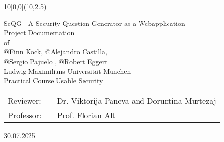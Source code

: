 \documentclass{thesisclass}
\makeatletter
\newcommand{\type}{Project Documentation}
\newcommand{\group}{\href{https://github.com/finnkock}{@Finn Kock}, \href{https://github.com/alecasbar}{@Alejandro Castilla}, \\
					\href{https://github.com/sergioPajuelo}{@Sergio Pajuelo} , \href{https://github.com/RobertEggert}{@Robert Eggert}}
\newcommand{\mytitle}{SeQG - A Security Question Generator as a Webapplication}
\newcommand{\course}{Practical Course Usable Security}
\newcommand{\reviewerone}{Dr. Viktorija Paneva and Doruntina Murtezaj}
\newcommand{\prof}{Prof. Florian Alt}
\newcommand{\timeend}{30.07.2025}
\makeatother
\begin{document}
\begin{titlepage}
	\begin{textblock}{10}[0,0](10,2.5)
	\end{textblock}
	\vspace*{3cm}
	\begin{center}
		\Huge{\mytitle}
		\vspace*{1.6cm}\\ %
		\Large{
			\type\\of
		}\\
		\vspace*{1cm}
		\huge{\group}\\
		\vspace*{1cm} %
		\Large{
			{Ludwig-Maximilians-Universität München}
			\\
			\course
		}
	\end{center}
	\vspace*{1.8cm} %
	\Large{
		\begin{center}
			\begin{tabular}[ht]{l c l}

				Reviewer: & \hfill  & \reviewerone\\
                Professor: & \hfill & \prof
			
			\end{tabular}
		\end{center}
	}
	
	
	\vspace{1.8cm} %
	\begin{center}
		\timeend
	\end{center}
	
	
	
\end{titlepage}
\renewcommand{\contentsname}{Index}
\tableofcontents
\clearpage




\end{document}
